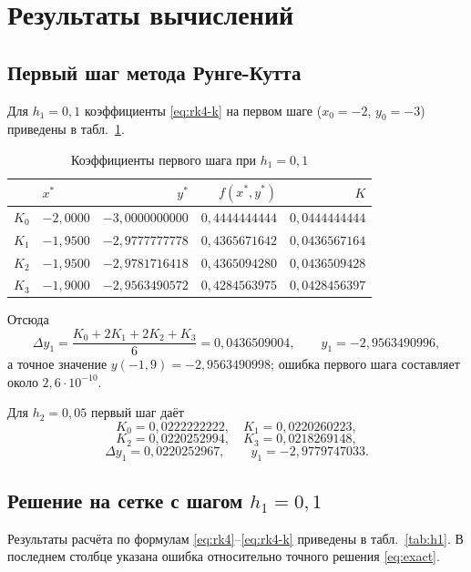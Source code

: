 \documentclass[14pt,a4paper]{extarticle}
\begin{document}
\section{Результаты вычислений}

\subsection{Первый шаг метода Рунге-Кутта}

Для $h_1=0{,}1$ коэффициенты \eqref{eq:rk4-k} на первом шаге
($x_0=-2$, $y_0=-3$) приведены в табл.~\ref{tab:k1}.

\begin{table}[H]
    \centering
    \caption{Коэффициенты первого шага при $h_1=0{,}1$}
    \label{tab:k1}
    \small
    \begin{tabular}{clrrr}
        \toprule
        & $x^*$ & $y^*$ & $f(x^*,y^*)$ & $K$\\
        \midrule
        $K_0$ & $-2{,}0000$ & $-3{,}0000000000$ & $0{,}4444444444$ & $0{,}0444444444$\\
        $K_1$ & $-1{,}9500$ & $-2{,}9777777778$ & $0{,}4365671642$ & $0{,}0436567164$\\
        $K_2$ & $-1{,}9500$ & $-2{,}9781716418$ & $0{,}4365094280$ & $0{,}0436509428$\\
        $K_3$ & $-1{,}9000$ & $-2{,}9563490572$ & $0{,}4284563975$ & $0{,}0428456397$\\
        \bottomrule
    \end{tabular}
\end{table}

Отсюда
\[
    \Delta y_1 = \frac{K_0+2K_1+2K_2+K_3}{6} = 0{,}0436509004,
    \qquad y_1 = -2{,}9563490996,
\]
а точное значение $y(-1{,}9)=-2{,}9563490998$; ошибка первого шага
составляет около $2{,}6\cdot10^{-10}$.

Для $h_2=0{,}05$ первый шаг даёт
\[
    K_0=0{,}0222222222,\quad K_1=0{,}0220260223,
\]
\[
    K_2=0{,}0220252994,\quad K_3=0{,}0218269148,
\]
\[
    \Delta y_1 = 0{,}0220252967,\qquad
    y_1 = -2{,}9779747033 .
\]

\subsection{Решение на сетке с шагом $h_1=0{,}1$}

Результаты расчёта по формулам \eqref{eq:rk4}--\eqref{eq:rk4-k}
приведены в табл.~\ref{tab:h1}. В последнем столбце указана ошибка
относительно точного решения \eqref{eq:exact}.
\end{document}
